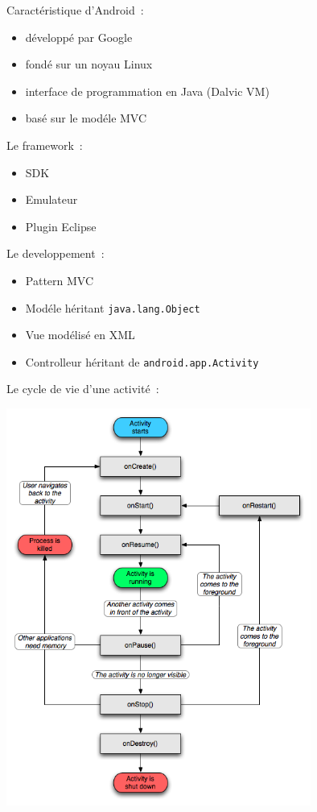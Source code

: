 \documentclass{beamer}
\def\android{Android\texttrademark}
\begin{document}
\begin{frame}
 Caractéristique d'\android{}~:
  \begin{itemize}
    \item<+-> développé par Google
    \item<+-> fondé sur un noyau Linux
    \item<+-> interface de programmation en Java (Dalvic VM)
    \item<+-> basé sur le modéle MVC
  \end{itemize}
\end{frame}

\begin{frame}
  Le framework~:
  \begin{itemize}
    \item<+-> SDK
    \item<+-> Emulateur
    \item<+-> Plugin Eclipse
  \end{itemize}
\end{frame}

\begin{frame}
  Le developpement~:
  \begin{itemize}
    \item<+-> Pattern MVC
    \item<+-> Modéle héritant \verb!java.lang.Object!
    \item<+-> Vue modélisé en XML
    \item<+-> Controlleur héritant de \verb!android.app.Activity!
  \end{itemize}
\end{frame}

\begin{frame}
  Le cycle de vie d'une activité~:
  \begin{minipage}{\textwidth}
   \centering 
       \includegraphics[width=0.75\textwidth]{img/activity_lifecycle.png}
  \end{minipage}
\end{frame}
\end{document}
